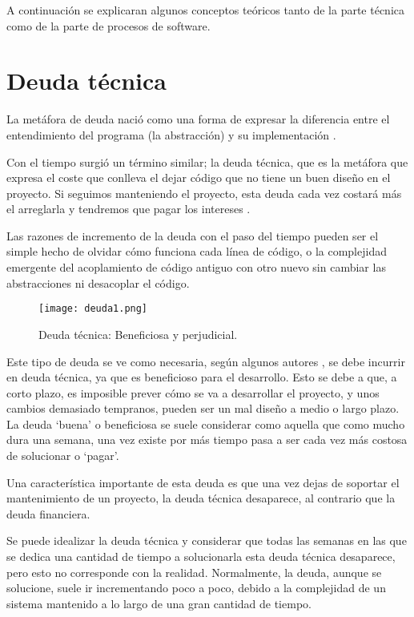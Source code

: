 
A continuación se explicaran algunos conceptos teóricos tanto de la parte técnica como de la parte de procesos de software.


\section{Deuda técnica}

La metáfora de deuda nació como una forma de expresar la diferencia entre el entendimiento del programa (la abstracción) y su implementación \cite{cu09}.

Con el tiempo surgió un término similar; la deuda técnica, que es la metáfora que expresa el coste que conlleva el dejar código que no tiene un buen diseño en el proyecto. Si seguimos manteniendo el proyecto, esta deuda cada vez costará más el arreglarla y tendremos que pagar los intereses \cite{fow03}.

Las razones de incremento de la deuda con el paso del tiempo pueden ser el simple hecho de olvidar cómo funciona cada línea de código, o la complejidad emergente del acoplamiento de código antiguo con otro nuevo sin cambiar las abstracciones ni desacoplar el código.

\begin{figure}
	\centering
	\texttt{[image: deuda1.png]}
	\caption[Deuda técnica: Beneficiosa y perjudicial]{Deuda técnica: Beneficiosa y perjudicial\cite{kni13}.}\label{fig:deuda1.png}
\end{figure}


Este tipo de deuda se ve como necesaria, según algunos autores \cite{kni13}, se debe incurrir en deuda técnica, ya que es beneficioso para el desarrollo. Esto se debe a que, a corto plazo, es imposible prever cómo se va a desarrollar el proyecto, y unos cambios demasiado tempranos, pueden ser un mal diseño a medio o largo plazo. La deuda `buena' o beneficiosa se suele considerar como aquella que como mucho dura una semana, una vez existe por más tiempo pasa a ser cada vez más costosa de solucionar o `pagar'.


Una característica importante de esta deuda es que una vez dejas de soportar el mantenimiento de un proyecto, la deuda técnica desaparece, al contrario que la deuda financiera.

Se puede idealizar la deuda técnica y considerar que todas las semanas en las que se dedica una cantidad de tiempo a solucionarla esta deuda técnica desaparece, pero esto no corresponde con la realidad. Normalmente, la deuda, aunque se solucione, suele ir incrementando poco a poco, debido a la complejidad de un sistema mantenido a lo largo de una gran cantidad de tiempo.


